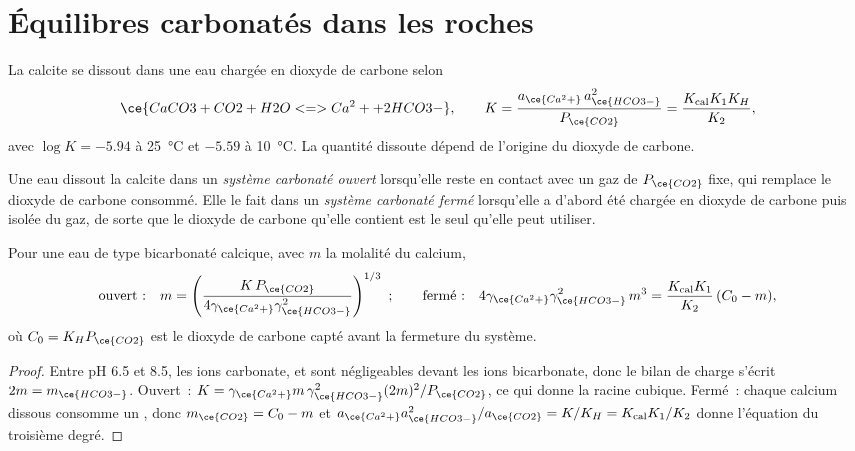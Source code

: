 \section{Équilibres carbonatés dans les roches}\label{sec:b3:water-rock-interaction:carbonate}

La calcite se dissout dans une eau chargée en dioxyde de carbone selon
\[
\ce{CaCO3 + CO2 + H2O <=> Ca^2+ + 2 HCO3-},
\qquad K = \frac{a_{\ce{Ca^2+}}\,a_{\ce{HCO3-}}^2}{P_{\ce{CO2}}}
= \frac{K_{\mathrm{cal}}K_1K_H}{K_2},
\]
avec $\log K = -5.94$ à \qty{25}{\celsius} et $-5.59$ à \qty{10}{\celsius}.
La quantité dissoute dépend de l'origine du dioxyde de carbone.

\begin{definition}\label{def:b3:water-rock-interaction:open-closed}
Une eau dissout la calcite dans un \emph{système carbonaté ouvert}
lorsqu'elle reste en contact avec un gaz de
$P_{\ce{CO2}}$ fixe, qui remplace le dioxyde de carbone consommé. Elle le fait dans un
\emph{système carbonaté fermé} lorsqu'elle a d'abord été
chargée en dioxyde de carbone puis isolée du gaz, de sorte que
le dioxyde de carbone qu'elle contient est le seul qu'elle peut utiliser.
\end{definition}

\begin{theorem}\label{thm:b3:water-rock-interaction:calcite}
Pour une eau de type bicarbonaté calcique, avec $m$ la molalité du calcium,
\[
\text{ouvert~:}\quad m = \left(\frac{K\,P_{\ce{CO2}}}{4\gamma_{\ce{Ca^2+}}
\gamma_{\ce{HCO3-}}^2}\right)^{1/3}~;
\qquad
\text{fermé~:}\quad 4\gamma_{\ce{Ca^2+}}\gamma_{\ce{HCO3-}}^2\,m^3 =
\frac{K_{\mathrm{cal}}K_1}{K_2}\,(C_0 - m),
\]
où $C_0 = K_H P_{\ce{CO2}}$ est le dioxyde de carbone capté avant
la fermeture du système.
\end{theorem}

\begin{proof}
Entre pH 6.5 et 8.5, les ions carbonate,  et  sont négligeables devant
les ions bicarbonate, donc le bilan de charge s'écrit $2m = m_{\ce{HCO3-}}$. Ouvert~: $K = \gamma
_{\ce{Ca^2+}}m\,\gamma_{\ce{HCO3-}}^2(2m)^2/P_{\ce{CO2}}$, ce qui donne la
racine cubique. Fermé~: chaque calcium dissous consomme un , donc $m_{\ce{CO2}}
= C_0 - m$ et $a_{\ce{Ca^2+}}a_{\ce{HCO3-}}^2/a_{\ce{CO2}} = K/K_H =
K_{\mathrm{cal}}K_1/K_2$ donne l'équation du troisième degré.
\end{proof}

